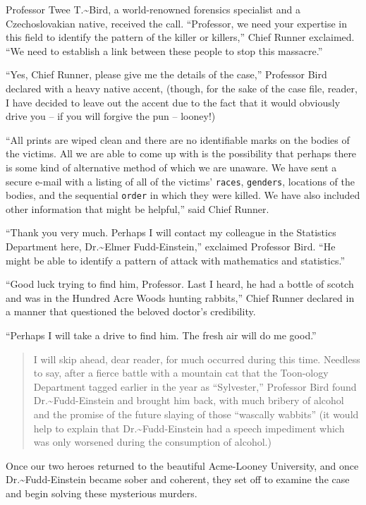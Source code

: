 \documentclass[captions=tableheading]{scrbook}
\begin{document}
Professor Twee T.\~{}Bird, a world-renowned forensics specialist and a Czechoslovakian native, received the call. “Professor, we need your expertise in this field to identify the pattern of the killer or killers,” Chief Runner exclaimed. “We need to establish a link between these people to stop this massacre.” 

“Yes, Chief Runner, please give me the details of the case,” Professor Bird declared with a heavy native accent, (though, for the sake of the case file, reader, I have decided to leave out the accent due to the fact that it would obviously drive you -- if you will forgive the pun -- looney!) 

“All prints are wiped clean and there are no identifiable marks on the bodies of the victims. All we are able to come up with is the possibility that perhaps there is some kind of alternative method of which we are unaware. We have sent a secure e-mail with a listing of all of the victims’ \texttt{races}, \texttt{genders}, locations of the bodies, and the sequential \texttt{order} in which they were killed. We have also included other information that might be helpful,” said Chief Runner.

“Thank you very much. Perhaps I will contact my colleague in the Statistics Department here, Dr.\~{}Elmer Fudd-Einstein,” exclaimed Professor Bird. “He might be able to identify a pattern of attack with mathematics and statistics.”

“Good luck trying to find him, Professor. Last I heard, he had a bottle of scotch and was in the Hundred Acre Woods hunting rabbits,” Chief Runner declared in a manner that questioned the beloved doctor’s credibility. 

“Perhaps I will take a drive to find him. The fresh air will do me good.”

\begin{quote}
\noindent I will skip ahead, dear reader, for much occurred during this time. Needless to say, after a fierce battle with a mountain cat that the Toon-ology Department tagged earlier in the year as “Sylvester,” Professor Bird found Dr.\~{}Fudd-Einstein and brought him back, with much bribery of alcohol and the promise of the future slaying of those “wascally wabbits” (it would help to explain that Dr.\~{}Fudd-Einstein had a speech impediment which was only worsened during the consumption of alcohol.)
\end{quote}

Once our two heroes returned to the beautiful Acme-Looney University, and once Dr.\~{}Fudd-Einstein became sober and coherent, they set off to examine the case and begin solving these mysterious murders.
\end{document}
